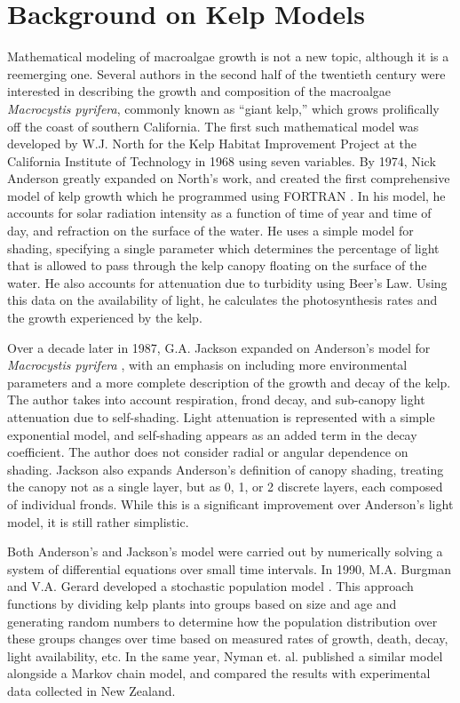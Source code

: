 \documentclass[ms,cpyr,lof,lot]{uathesis}
\begin{document}
\section{Background on Kelp Models}

Mathematical modeling of macroalgae growth is not a new topic, although it is a reemerging one.
Several authors in the second half of the twentieth century were interested in describing the growth and composition of the macroalgae \textit{Macrocystis pyrifera}, commonly known as ``giant kelp,'' which grows prolifically off the coast of southern California.
The first such mathematical model was developed by W.J. North for the Kelp Habitat Improvement Project at the California Institute of Technology in 1968 using seven variables.
By 1974, Nick Anderson greatly expanded on North's work, and created the first comprehensive model of kelp growth which he programmed using FORTRAN \cite{anderson_mathematical_1974}.
In his model, he accounts for solar radiation intensity as a function of time of year and time of day, and refraction on the surface of the water.
He uses a simple model for shading, specifying a single parameter which determines the percentage of light that is allowed to pass through the kelp canopy floating on the surface of the water.
He also accounts for attenuation due to turbidity using Beer's Law.
Using this data on the availability of light, he calculates the photosynthesis rates and the growth experienced by the kelp.

Over a decade later in 1987, G.A.
Jackson expanded on Anderson's model for \textit{Macrocystis pyrifera} \cite{jackson_modelling_1987}, with an emphasis on including more environmental parameters and a more complete description of the growth and decay of the kelp.
The author takes into account respiration, frond decay, and sub-canopy light attenuation due to self-shading.
Light attenuation is represented with a simple exponential model, and self-shading appears as an added term in the decay coefficient.
The author does not consider radial or angular dependence on shading.
Jackson also expands Anderson's definition of canopy shading, treating the canopy not as a single layer, but as 0, 1, or 2 discrete layers, each composed of individual fronds.
While this is a significant improvement over Anderson's light model, it is still rather simplistic.

Both Anderson's and Jackson's model were carried out by numerically solving a system of differential equations over small time intervals.
In 1990, M.A. Burgman and V.A. Gerard developed a stochastic population model \cite{burgman_stage-structured_1990}.
This approach functions by dividing kelp plants into groups based on size and age and generating random numbers to determine how the population distribution over these groups changes over time based on measured rates of growth, death, decay, light availability, etc.
In the same year, Nyman et. al. \cite{nyman_macrocystis_1990} published a similar model alongside a Markov chain model, and compared the results with experimental data collected in New Zealand.
\end{document}
